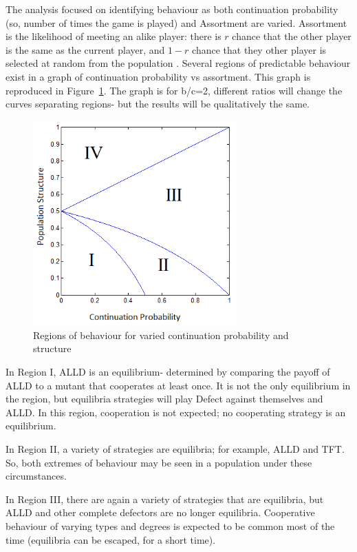\documentclass[a4paper,11pt,bcshonoursthesis,singlespace,twoside]{cssethesis}
\begin{document}
The analysis focused on identifying behaviour as both continuation probability (so, number of times the game is played) and Assortment are varied. Assortment is the likelihood of meeting an alike player: there is $r$ chance that the other player is the same as the current player, and $1-r$ chance that they other player is selected at random from the population \citep{eshel:PNAS:1982}. Several regions of predictable behaviour exist in a graph of continuation probability vs assortment. This graph is reproduced in Figure~\ref{fig:regions}. The graph is for b/c=2, different ratios will change the curves separating regions- but the results will be qualitatively the same. 

\begin{figure}[h!]
\centering
\includegraphics[width=0.7\textwidth]{regions}
\caption{Regions of behaviour for varied continuation probability and structure}
\label{fig:regions}
\end{figure}

In Region I, ALLD is an equilibrium- determined by comparing the payoff of ALLD to a mutant that cooperates at least once. It is not the only equilibrium in the region, but equilibria strategies will play Defect against themselves and ALLD. In this region, cooperation is not expected; no cooperating strategy is an equilibrium.

In Region II, a variety of strategies are equilibria; for example, ALLD and TFT. So, both extremes of behaviour may be seen in a population under these circumstances. 

In Region III, there are again a variety of strategies that are equilibria, but ALLD and other complete defectors are no longer equilibria. Cooperative behaviour of varying types and degrees is expected to be common most of the time (equilibria can be escaped, for a short time).
\end{document}
